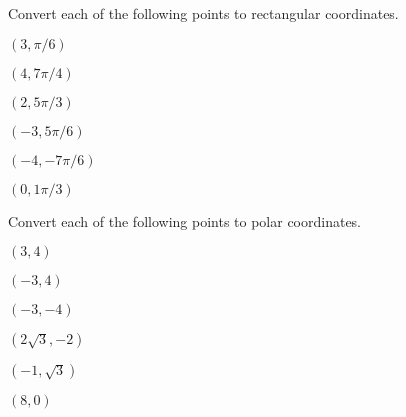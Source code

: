 \documentclass{exam}
\begin{document}
\noindent Convert each of the following points to rectangular coordinates.
\begin{questions}
    \begin{minipage}{.3\linewidth}
        \question $(3,\pi/6)$    
    \end{minipage}
    \hfill
    \begin{minipage}{.3\linewidth}
        \question $(4,7\pi/4)$    
    \end{minipage}
    \hfill
    \begin{minipage}{.3\linewidth}
        \question $(2,5\pi/3)$    
    \end{minipage}


    \begin{minipage}{.3\linewidth}
        \question $(-3,5\pi/6)$    
    \end{minipage}
    \hfill
    \begin{minipage}{.3\linewidth}
        \question $(-4,-7\pi/6)$    
    \end{minipage}
    \hfill
    \begin{minipage}{.3\linewidth}
        \question $(0,1\pi/3)$    
    \end{minipage}


\end{questions}

\noindent Convert each of the following points to polar coordinates.
\begin{questions}
    \begin{minipage}{.3\linewidth}
        \question $(3,4)$    
    \end{minipage}
    \hfill
    \begin{minipage}{.3\linewidth}
        \question $(-3,4)$    
    \end{minipage}
    \hfill
    \begin{minipage}{.3\linewidth}
        \question $(-3,-4)$    
    \end{minipage}


    \begin{minipage}{.3\linewidth}
        \question $(2\sqrt{3},-2)$    
    \end{minipage}
    \hfill
    \begin{minipage}{.3\linewidth}
        \question $(-1,\sqrt{3})$    
    \end{minipage}
    \hfill
    \begin{minipage}{.3\linewidth}
        \question $(8,0)$    
    \end{minipage}


\end{questions}
\end{document}
